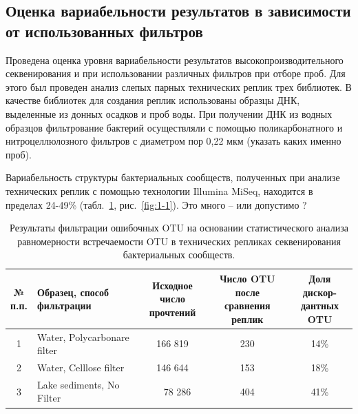 \documentclass[a4paper,12pt,openany,final]{extreport}
\def\oldcaption{} \let\oldcaption=\caption
\def\caption{\stepcounter{captionsnum}\oldcaption}
\newcommand\T{\rule{0pt}{2.6ex}}       %
\begin{document}
\subsection{Оценка вариабельности результатов в зависимости от
использованных фильтров}

Проведена оценка уровня вариабельности результатов
высокопроизводительного секвенирования и при использовании различных
фильтров при отборе проб. Для этого был проведен анализ слепых парных
технических реплик трех библиотек. В качестве библиотек для создания
реплик использованы образцы ДНК, выделенные из донных осадков и проб
воды. При получении ДНК из водных образцов фильтрование бактерий
осуществляли с помощью поликарбонатного и нитроцеллюлозного фильтров с
диаметром пор 0,22 мкм (указать каких именно проб).

Вариабельность структуры бактериальных сообществ, полученных при анализе
технических реплик с помощью технологии Illumina MiSeq, находится в
пределах 24-49\% (табл.~\ref{table:1-1}, рис.~\ref{fig:1-1}). Это много -- или допустимо ?

\begin{table}
\caption{Результаты фильтрации ошибочных OTU на основании
статистического анализа равномерности встречаемости OTU в технических
репликах секвенирования бактериальных сообществ.%
}\label{table:1-1}
\vspace{1em}
\centering

{\small%
  \begin{tabular}[]{|c|l|c|c|c|}
\hline
\makecell{\T №\\п.п.} &\makecell[cc]{Образец, способ\\ фильтрации}&\makecell[cc]{Исходное число\\ прочтений}&\makecell[cc]{Число OTU после\\ сравнения реплик}& \makecell[cc]{Доля дискор-\\дантных OTU}\\\hline
1 &\T Water, Polycarbonare filter & 166 819 & 230 & 14\% \\
2 & Water, Celllose filter & 146 644 & 153 & 18\%\\
3 & Lake sediments, No Filter & \ \ 78 286 & 404 & 41\%\\\hline
  \end{tabular}}
\end{table}
\end{document}
